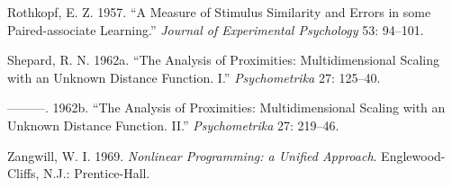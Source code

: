 \documentclass[
  12pt,
]{article}
\newlength{\cslhangindent}
\newlength{\cslentryspacingunit} %
\newenvironment{CSLReferences}[2] %
 {%
  \setlength{\parindent}{0pt}
  \ifodd #1
  \let\oldpar\par
  \def\par{\hangindent=\cslhangindent\oldpar}
  \fi
  \setlength{\parskip}{#2\cslentryspacingunit}
 }%
 {}
\begin{document}
\begin{CSLReferences}{1}{0}
\leavevmode{}%
Rothkopf, E. Z. 1957. {``{A Measure of Stimulus Similarity and Errors in
some Paired-associate Learning}.''} \emph{Journal of Experimental
Psychology} 53: 94--101.

\leavevmode{}%
Shepard, R. N. 1962a. {``{The Analysis of Proximities: Multidimensional
Scaling with an Unknown Distance Function. I}.''} \emph{Psychometrika}
27: 125--40.

\leavevmode{}%
---------. 1962b. {``{The Analysis of Proximities: Multidimensional
Scaling with an Unknown Distance Function. II}.''} \emph{Psychometrika}
27: 219--46.

\leavevmode{}%
Zangwill, W. I. 1969. \emph{{Nonlinear Programming: a Unified
Approach}}. Englewood-Cliffs, N.J.: Prentice-Hall.

\end{CSLReferences}
\end{document}
